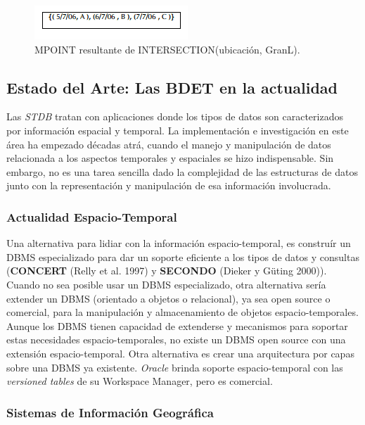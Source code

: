 \documentclass[a4paper,12pt,oneside]{report}
\begin{document}
\begin{figure}
\center
\includegraphics[scale=0.6]{images/gutinguin.png}
\caption{MPOINT resultante de INTERSECTION(ubicaci\'on, GranL).}
\end{figure}

\subsection*{Estado del Arte: Las BDET en la actualidad}
Las \textit{STDB} tratan con aplicaciones donde los tipos de datos son caracterizados por informaci\'on espacial y temporal. La implementaci\'on e investigaci\'on en este \'area ha empezado d\'ecadas atr\'a, cuando el manejo y manipulaci\'on de datos relacionada a los aspectos temporales y espaciales se hizo indispensable. Sin embargo, no es una tarea sencilla dado la complejidad de las estructuras de datos junto con la representaci\'on y manipulaci\'on de esa informaci\'on involucrada.

\subsubsection*{Actualidad Espacio-Temporal}
Una alternativa para lidiar con la informaci\'on espacio-temporal, es constru\'ir un DBMS especializado para dar un soporte eficiente a los tipos de datos y consultas (\textbf{CONCERT} (Relly et al. 1997) y \textbf{SECONDO} (Dieker y G\"uting 2000)). Cuando no sea posible usar un DBMS especializado, otra alternativa ser\'ia extender un DBMS (orientado a objetos o relacional), ya sea open source o comercial, para la manipulaci\'on y almacenamiento de objetos espacio-temporales.\\
Aunque los DBMS tienen capacidad de extenderse y mecanismos para soportar estas necesidades espacio-temporales, no existe un DBMS open source con una extensi\'on espacio-temporal. Otra alternativa es crear una arquitectura por capas sobre una DBMS ya existente. \textit{Oracle} brinda soporte espacio-temporal con las \textit{versioned tables} de su Workspace Manager, pero es comercial.

\subsubsection*{Sistemas de Informaci\'on Geogr\'afica}
\end{document}
